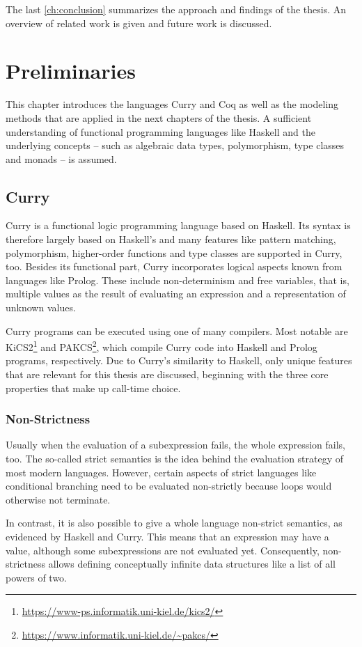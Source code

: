 \documentclass[a4paper, 11pt, fleqn, twoside, abstract=on]{scrreprt}
\begin{document}
The last \autoref{ch:conclusion} summarizes the approach and findings of the thesis.
An overview of related work is given and future work is discussed.

\chapter{Preliminaries}
\label{ch:preliminaries}
This chapter introduces the languages Curry and Coq as well as the modeling methods that are applied in the next chapters of the thesis.
A sufficient understanding of functional programming languages like Haskell and the underlying concepts -- such as algebraic data types, polymorphism, type classes and monads -- is assumed.


\section{Curry}
Curry \citep{hanus2016curry} is a functional logic programming language based on Haskell.
Its syntax is therefore largely based on Haskell's and many features like pattern matching, polymorphism, higher-order functions and type classes are supported in Curry, too.
Besides its functional part, Curry incorporates logical aspects known from languages like Prolog.
These include non-determinism and free variables, that is,  multiple values as the result of evaluating an expression and a representation of unknown values.

Curry programs can be executed using one of many compilers.
Most notable are KiCS2\footnote{\url{https://www-ps.informatik.uni-kiel.de/kics2/}} and PAKCS\footnote{\url{https://www.informatik.uni-kiel.de/~pakcs/}}, which compile Curry code into Haskell and Prolog programs, respectively.
Due to Curry's similarity to Haskell, only unique features that are relevant for this thesis are discussed, beginning with the three core properties that make up call-time choice.

\subsection{Non-Strictness}
Usually when the evaluation of a subexpression fails, the whole expression fails, too.
The so-called strict semantics is the idea behind the evaluation strategy of most modern languages.
However, certain aspects of strict languages like conditional branching need to be evaluated non-strictly because loops would otherwise not terminate.

In contrast, it is also possible to give a whole language non-strict semantics, as evidenced by Haskell and Curry.
This means that an expression may have a value, although some subexpressions are not evaluated yet.
Consequently, non-strictness allows defining conceptually infinite data structures like a list of all powers of two.
\end{document}
